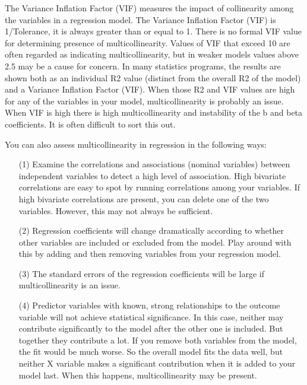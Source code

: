 \documentclass[12pt]{article}
\begin{document}
The Variance Inflation Factor (VIF) measures the impact of collinearity among the variables in a regression model. The Variance Inflation Factor (VIF) is 1/Tolerance, it is always greater than or equal to 1. There is no formal VIF value for determining presence of multicollinearity. Values of VIF that exceed 10 are often regarded as indicating multicollinearity, but in weaker models values above 2.5 may be a cause for concern. In many statistics programs, the results are shown both as an individual R2 value (distinct from the overall R2 of the model) and a Variance Inflation Factor (VIF). When those R2 and VIF values are high for any of the variables in your model, multicollinearity is probably an issue. When VIF is high there is high multicollinearity and instability of the b and beta coefficients. It is often difficult to sort this out. \\

\bigskip

You can also assess multicollinearity in regression in the following ways:

\begin{itemize}
	\item [(1)] Examine the correlations and associations (nominal variables) between independent variables to detect a high level of association. High bivariate correlations are easy to spot by running correlations among your variables. If high bivariate correlations are present, you can delete one of the two variables. However, this may not always be sufficient.
	
	\item [(2)] Regression coefficients will change dramatically according to whether other variables are included or excluded from the model. Play around with this by adding and then removing variables from your regression model.
	
	\item [(3)] The standard errors of the regression coefficients will be large if multicollinearity is an issue.
	
	\item [(4)] Predictor variables with known, strong relationships to the outcome variable will not achieve statistical significance. In this case, neither may contribute significantly to the model after the other one is included. But together they contribute a lot. If you remove both variables from the model, the fit would be much worse. So the overall model fits the data well, but neither X variable makes a significant contribution when it is added to your model last. When this happens, multicollinearity may be present.
	
\end{itemize}
\end{document}
